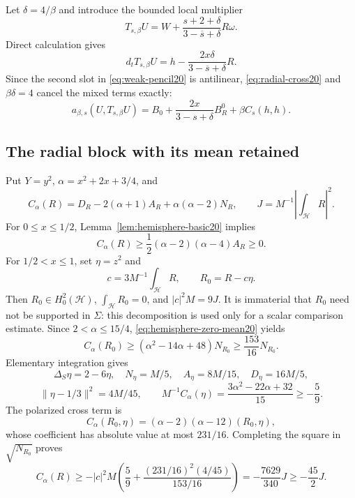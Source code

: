 \documentclass[11pt,a4paper]{article}
\theoremstyle{remark}
\numberwithin{equation}{section}
\begin{document}
Let $\delta=4/\beta$ and introduce the bounded local multiplier
\begin{equation}\label{eq:test-transform20}
 T_{s,\beta}U=W+\frac{s+2+\delta}{3-\overline s+\delta}R\omega.
\end{equation}
Direct calculation gives
\[
 d_tT_{s,\beta}U=h-\frac{2x\delta}{3-\overline s+\delta}R.
\]
Since the second slot in \eqref{eq:weak-pencil20} is antilinear,
\eqref{eq:radial-cross20} and $\beta\delta=4$ cancel the mixed terms
exactly:
\begin{equation}\label{eq:exact-transformed20}
 a_{\beta,s}(U,T_{s,\beta}U)
 =B_0+\frac{2x}{3-s+\delta}B_R^0+\beta C_s(h,h).
\end{equation}

\subsection{The radial block with its mean retained}

Put $Y=y^2$, $\alpha=x^2+2x+3/4$, and
\[
 C_\alpha(R)=D_R-2(\alpha+1)A_R+\alpha(\alpha-2)N_R,
 \qquad J=M^{-1}\left|\int_{\mathcal H}R\right|^2.
\]
For $0\le x\le1/2$, Lemma~\ref{lem:hemisphere-basic20} implies
\begin{equation}\label{eq:radial-low20}
 C_\alpha(R)\ge\frac12(\alpha-2)(\alpha-4)A_R\ge0.
\end{equation}
For $1/2<x\le1$, set $\eta=z^2$ and
\[
 c=3M^{-1}\int_{\mathcal H}R,\qquad R_0=R-c\eta.
\]
Then $R_0\in H_0^2(\mathcal H)$, $\int_{\mathcal H}R_0=0$, and
$|c|^2M=9J$. It is immaterial that $R_0$ need not be supported in
$\Sigma$: this decomposition is used only for a scalar comparison estimate.
Since $2<\alpha\le15/4$, \eqref{eq:hemisphere-zero-mean20} yields
\begin{equation}\label{eq:radial-zero-mean20}
 C_\alpha(R_0)\ge(\alpha^2-14\alpha+48)N_{R_0}
 \ge\frac{153}{16}N_{R_0}.
\end{equation}
Elementary integration gives
\[
 \Delta_S\eta=2-6\eta,\quad
 N_\eta=M/5,\quad A_\eta=8M/15,\quad D_\eta=16M/5,
\]
\[
 \|\eta-1/3\|^2=4M/45,\qquad
 M^{-1}C_\alpha(\eta)=\frac{3\alpha^2-22\alpha+32}{15}\ge-\frac59.
\]
The polarized cross term is
\[
 C_\alpha(R_0,\eta)=(\alpha-2)(\alpha-12)(R_0,\eta),
\]
whose coefficient has absolute value at most $231/16$.
Completing the square in $\sqrt{N_{R_0}}$ proves
\begin{equation}\label{eq:radial-mean-loss20}
 C_\alpha(R)\ge
 -|c|^2M\left(\frac59+
 \frac{(231/16)^2(4/45)}{153/16}\right)
 =-\frac{7629}{340}J\ge-\frac{45}{2}J.
\end{equation}
\end{document}

